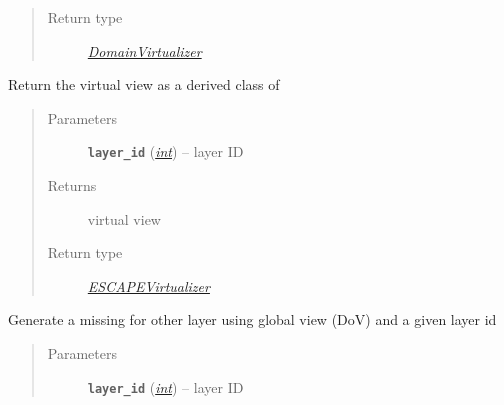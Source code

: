 \documentclass[letterpaper,10pt,english]{sphinxmanual}
\begin{document}
\begin{fulllineitems}
\begin{fulllineitems}
\begin{quote}
\begin{description}
\item[{Return type}] \leavevmode
{\hyperref[adapt/adaptation:escape.adapt.adaptation.DomainVirtualizer]{\emph{DomainVirtualizer}}}

\end{description}\end{quote}

\end{fulllineitems}


\begin{fulllineitems}
\label{orchest/virtualization_mgmt:escape.orchest.virtualization_mgmt.VirtualizerManager.get_virtual_view}
Return the virtual view as a derived class of {\hyperref[orchest/virtualization_mgmt:escape.orchest.virtualization_mgmt.AbstractVirtualizer]{\emph{}}}
\begin{quote}\begin{description}
\item[{Parameters}] \leavevmode
\textbf{\texttt{layer\_id}} (\href{https://docs.python.org/2.7/library/functions.html\#int}{\emph{int}}) -- layer ID

\item[{Returns}] \leavevmode
virtual view

\item[{Return type}] \leavevmode
{\hyperref[orchest/virtualization_mgmt:escape.orchest.virtualization_mgmt.ESCAPEVirtualizer]{\emph{ESCAPEVirtualizer}}}

\end{description}\end{quote}

\end{fulllineitems}


\begin{fulllineitems}
\label{orchest/virtualization_mgmt:escape.orchest.virtualization_mgmt.VirtualizerManager._generate_virtual_view}
Generate a missing {\hyperref[orchest/virtualization_mgmt:escape.orchest.virtualization_mgmt.ESCAPEVirtualizer]{\emph{}}} for other layer using global
view (DoV) and a given layer id
\begin{quote}\begin{description}
\item[{Parameters}] \leavevmode
\textbf{\texttt{layer\_id}} (\href{https://docs.python.org/2.7/library/functions.html\#int}{\emph{int}}) -- layer ID


\end{description}
\end{quote}
\end{fulllineitems}
\end{fulllineitems}
\end{document}
